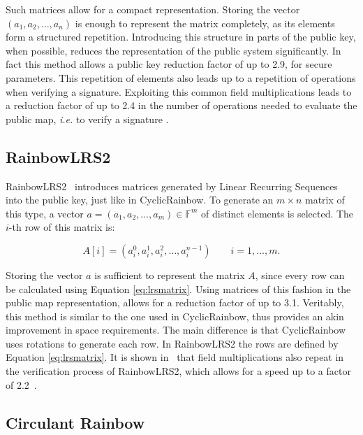 \documentclass{ufsctex/ufsctex}
\begin{document}
Such matrices allow for a compact representation. Storing the vector $(a_1,
a_2, \dots, a_n)$ is enough to represent the matrix completely, as its elements
form a structured repetition. Introducing this structure in parts of the public
key, when possible, reduces the representation of the public system
significantly. In fact this method allows a public key reduction factor of up
to 2.9, for secure parameters. This repetition of elements also leads up to a
repetition of operations when verifying a signature. Exploiting this common
field multiplications leads to a reduction factor of up to 2.4 in the number of
operations needed to evaluate the public map, \textit{i.e.} to verify a
signature \cite[Table 10.3]{petzoldt2013thesis}.

\subsection{RainbowLRS2}

RainbowLRS2~\cite[Section 9.2]{petzoldt2013thesis} introduces matrices
generated by Linear Recurring Sequences into the public key, just like in
CyclicRainbow. To generate an $m \times n$ matrix of this type, a vector $a =
(a_1, a_2, \dots, a_m) \in \mathbb{F}^m$ of distinct elements is selected.
The $i$-th row of this matrix is:

\begin{equation}\label{eq:lrsmatrix}
A[i] = (a_i^0, a_i^1, a_i^2, \dots, a_i^{n-1}) \qquad i = 1, \dots, m.
\end{equation}

Storing the vector $a$ is sufficient to represent the matrix $A$, since every
row can be calculated using Equation \ref{eq:lrsmatrix}. Using matrices of this
fashion in the public map representation, allows for a reduction factor of up
to 3.1. Veritably, this method is similar to the one used in CyclicRainbow,
thus provides an akin improvement in space requirements. The main difference is
that CyclicRainbow uses rotations to generate each row. In RainbowLRS2 the rows
are defined by Equation \ref{eq:lrsmatrix}. It is shown
in~\cite{petzoldt2013thesis} that field multiplications also repeat in the
verification process of RainbowLRS2, which allows for a speed up to a factor of
2.2~\cite[Table 10.3]{petzoldt2013thesis}.

\subsection{Circulant Rainbow}
\end{document}
